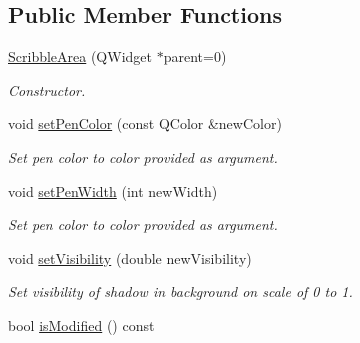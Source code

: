 \subsection*{\-Public \-Member \-Functions}
\begin{DoxyCompactItemize}
\item 
\hypertarget{classScribbleArea_a3560f2a44b46531591a1f4b1e42ea86f}{\hyperlink{classScribbleArea_a3560f2a44b46531591a1f4b1e42ea86f}{\-Scribble\-Area} (\-Q\-Widget $\ast$parent=0)}\label{classScribbleArea_a3560f2a44b46531591a1f4b1e42ea86f}

\begin{DoxyCompactList}\small\item\em \-Constructor. \end{DoxyCompactList}\item 
\hypertarget{classScribbleArea_a7ad908197d1fba9479da2b88d898ed42}{void \hyperlink{classScribbleArea_a7ad908197d1fba9479da2b88d898ed42}{set\-Pen\-Color} (const \-Q\-Color \&new\-Color)}\label{classScribbleArea_a7ad908197d1fba9479da2b88d898ed42}

\begin{DoxyCompactList}\small\item\em \-Set pen color to color provided as argument. \end{DoxyCompactList}\item 
\hypertarget{classScribbleArea_a3d9093f87987c3123744605a7a2cf15e}{void \hyperlink{classScribbleArea_a3d9093f87987c3123744605a7a2cf15e}{set\-Pen\-Width} (int new\-Width)}\label{classScribbleArea_a3d9093f87987c3123744605a7a2cf15e}

\begin{DoxyCompactList}\small\item\em \-Set pen color to color provided as argument. \end{DoxyCompactList}\item 
\hypertarget{classScribbleArea_a99eae1d7be108e4cde817f0ec395c8ed}{void \hyperlink{classScribbleArea_a99eae1d7be108e4cde817f0ec395c8ed}{set\-Visibility} (double new\-Visibility)}\label{classScribbleArea_a99eae1d7be108e4cde817f0ec395c8ed}

\begin{DoxyCompactList}\small\item\em \-Set visibility of shadow in background on scale of 0 to 1. \end{DoxyCompactList}\item 
\hypertarget{classScribbleArea_a39eccfe97fab1b788cc873d5de7fce46}{bool \hyperlink{classScribbleArea_a39eccfe97fab1b788cc873d5de7fce46}{is\-Modified} () const }\label{classScribbleArea_a39eccfe97fab1b788cc873d5de7fce46}


\end{DoxyCompactItemize}

